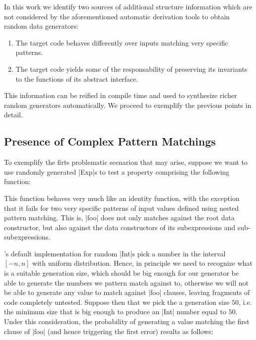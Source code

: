 In this work we identify two sources of additional structure information which
are not considered by the aforementioned automatic derivation tools to obtain
random data generators:

\begin{enumerate}
\item The target code behaves differently over inputs matching very specific
  patterns.
\item The target code yields some of the responsability of preserving its
  invariants to the functions of its abstract interface.
\end{enumerate}

This information can be reified in compile time and used to synthesize richer
random generators automatically. We proceed to exemplify the previous points in
detail.

\subsection{\textbf{Presence of Complex Pattern Matchings}}

To exemplify the firts problematic scenarion that may arise, suppose we want to
use randomly generated |Exp|s to test a property comprising the following
function:


This function behaves very much like an identity function, with the exception
that it fails for two very specific patterns of input values defined using
nested pattern matching.
%
This is, |foo| does not only matches against the root data constructor, but also
against the data constructors of its subexpressions and sub-subexpressions.


\quickcheck's default implementation for random |Int|s pick a number in the
interval $[-n, n]$ with uniform distribution.
%
Hence, in principle we need to recognize what is a suitable generation size,
which should be big enough for our generator be able to generate the numbers we
pattern match against to, otherwise we will not be able to generate any value to
match against |foo| clauses, leaving fragments of code completely untested.
%
Suppose then that we pick the a generation size $50$, i.e. the minimum size that
is big enough to produce an |Int| number equal to $50$.
%
Under this consideration, the probability of generating a value matching the
first clause of |foo| (and hence triggering the first error) results as follows:

